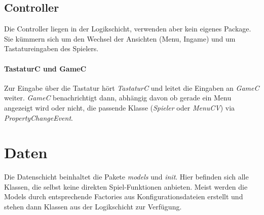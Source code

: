 \subsection{Controller}
Die Controller liegen in der Logikschicht, verwenden aber kein eigenes Package. Sie kümmern sich um 
den Wechsel der Ansichten (Menu, Ingame) und um Tastatureingaben des \gls{Spieler}s.

\paragraph{TastaturC und GameC}
Zur Eingabe über die Tastatur hört \textit{TastaturC} und leitet die Eingaben an \textit{GameC} 
weiter. \textit{GameC} benachrichtigt dann, abhängig davon ob gerade ein Menu angezeigt wird oder 
nicht, die passende Klasse (\textit{Spieler} oder \textit{MenuCV}) via \textit{PropertyChangeEvent}.

\newpage

\section{Daten}
Die Datenschicht beinhaltet die Pakete \textit{models} und \textit{init}.
Hier befinden sich alle Klassen, die selbst keine direkten Spiel-Funktionen anbieten. Meist werden 
die Models durch entsprechende Factories aus Konfigurationsdateien erstellt und stehen dann Klassen 
aus der Logikschicht zur Verfügung.

